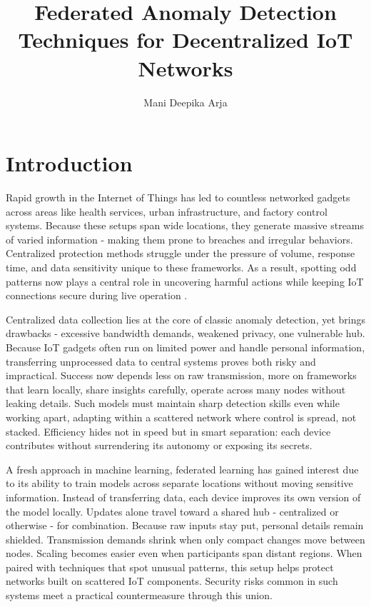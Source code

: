 \documentclass[12pt]{article}
\title{Federated Anomaly Detection Techniques for Decentralized IoT Networks}
\author{Mani Deepika Arja}
\date{}
\begin{document}
	\maketitle

    
	\section{Introduction}

Rapid growth in the Internet of Things has led to countless networked gadgets across areas like health services, urban infrastructure, and factory control systems. Because these setups span wide locations, they generate massive streams of varied information - making them prone to breaches and irregular behaviors. Centralized protection methods struggle under the pressure of volume, response time, and data sensitivity unique to these frameworks. As a result, spotting odd patterns now plays a central role in uncovering harmful actions while keeping IoT connections secure during live operation \cite{paper1,paper2}.

Centralized data collection lies at the core of classic anomaly detection, yet brings drawbacks - excessive bandwidth demands, weakened privacy, one vulnerable hub. Because IoT gadgets often run on limited power and handle personal information, transferring unprocessed data to central systems proves both risky and impractical. Success now depends less on raw transmission, more on frameworks that learn locally, share insights carefully, operate across many nodes without leaking details. Such models must maintain sharp detection skills even while working apart, adapting within a scattered network where control is spread, not stacked. Efficiency hides not in speed but in smart separation: each device contributes without surrendering its autonomy or exposing its secrets.

A fresh approach in machine learning, federated learning has gained interest due to its ability to train models across separate locations without moving sensitive information. Instead of transferring data, each device improves its own version of the model locally. Updates alone travel toward a shared hub - centralized or otherwise - for combination. Because raw inputs stay put, personal details remain shielded. Transmission demands shrink when only compact changes move between nodes. Scaling becomes easier even when participants span distant regions. When paired with techniques that spot unusual patterns, this setup helps protect networks built on scattered IoT components. Security risks common in such systems meet a practical countermeasure through this union.
\end{document}
